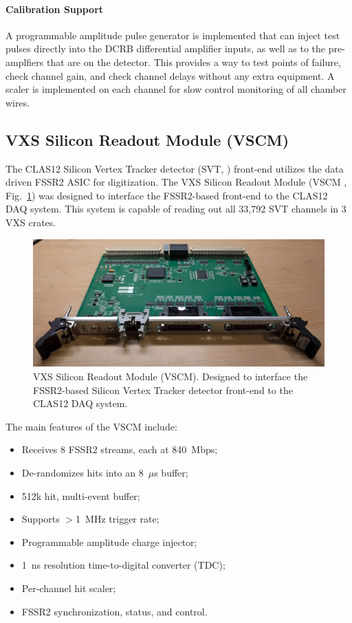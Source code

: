 \paragraph{Calibration Support}
A programmable amplitude pulse generator is implemented that can inject test pulses directly into the DCRB differential amplifier inputs, as well as to the pre-amplfiers that are on the detector. This provides a way to test points of failure, check channel gain, and check channel delays without any extra equipment. A scaler is implemented on each channel for slow control monitoring of all chamber wires.

\subsection{VXS Silicon Readout Module (VSCM)}
The CLAS12 Silicon Vertex Tracker detector (SVT, \cite{svt-ref}) front-end utilizes the data driven FSSR2 ASIC for digitization. The VXS Silicon Readout Module (VSCM \cite{vscm-ref}, Fig.~\ref{fig:vscm_board}) was designed to interface the FSSR2-based front-end to the CLAS12 DAQ system. This system is capable of reading out all 33,792 SVT channels in 3 VXS crates.

\begin{figure}[hbt]
	\centering
	\includegraphics[width=1.0\columnwidth,keepaspectratio]{img/vscm_board.png}
	\caption{VXS Silicon Readout Module (VSCM). Designed to interface the FSSR2-based Silicon Vertex Tracker detector front-end to the CLAS12 DAQ system.}
	\label{fig:vscm_board}
\end{figure}

The main features of the VSCM include:

\begin{itemize}
	\item Receives 8 FSSR2 streams, each at 840~Mbps;
	\item De-randomizes hits into an 8~$\mu$s buffer;
	\item 512k hit, multi-event buffer;
	\item Supports $>$1~MHz trigger rate;
	\item Programmable amplitude charge injector;
	\item 1~ns resolution time-to-digital converter (TDC);
	\item Per-channel hit scaler;
	\item FSSR2 synchronization, status, and control.
\end{itemize}

